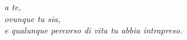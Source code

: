 %
%

%
%
\thispagestyle{empty}
%
%
%
\begin{flushright}
\textit{a te,\\ovunque tu sia,\\e qualunque percorso di vita tu abbia intrapreso.}
\end{flushright}
%
%
